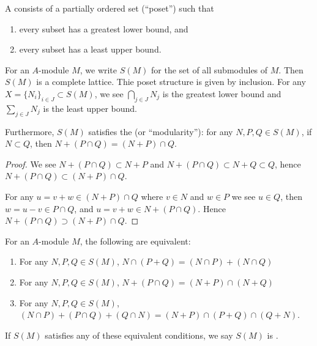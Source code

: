 
\lecture{}

\begin{definition}
A  consists of a partially ordered set
(``poset'') such that
\begin{enumerate}
\item every subset has a greatest lower bound, and
\item every subset has a least upper bound.
\end{enumerate}
\end{definition}

\begin{node}
For an $A$-module $M$, we write $S(M)$ for the set of all submodules
of $M$. Then $S(M)$ is a complete lattice. Thie poset structure is
given by inclusion. For any $X=\{N_{i}\}_{i\in J}\subset S(M)$, we see
$\bigcap_{j\in J}N_{j}$ is the greatest lower bound and $\sum_{j\in J}N_{j}$
is the least upper bound.

Furthermore, $S(M)$ satisfies the  (or ``modularity''):
for any $N,P,Q\in S(M)$, if $N\subset Q$, then $N+(P\cap Q)=(N+P)\cap Q$.
\end{node}

\begin{proof}
We see $N+(P\cap Q)\subset N+P$ and $N+(P\cap Q)\subset N+Q\subset Q$,
hence $N+(P\cap Q)\subset(N+P)\cap Q$.

For any $u=v+w\in(N+P)\cap Q$ where $v\in N$ and $w\in P$ we see $u\in Q$,
then $w=u-v\in P\cap Q$, and $u=v+w\in N+(P\cap Q)$.
Hence $N+(P\cap Q)\supset(N+P)\cap Q$.
\end{proof}

\begin{lemma}\label{lemma:2.7}
For an $A$-module $M$, the following are equivalent:
\begin{enumerate}
\item For any $N,P,Q\in S(M)$, $N\cap(P+Q)=(N\cap P)+(N\cap Q)$
\item For any $N,P,Q\in S(M)$, $N+(P\cap Q)=(N+P)\cap(N+Q)$
\item For any $N,P,Q\in S(M)$, $(N\cap P)+(P\cap Q)+(Q\cap N)=(N+P)\cap(P+Q)\cap(Q+N)$.
\end{enumerate}
If $S(M)$ satisfies any of these equivalent conditions, we say $S(M)$
is .
\end{lemma}

